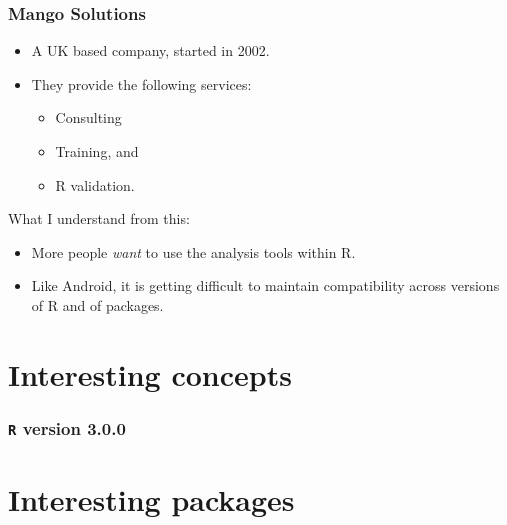 \documentclass{beamer}
\begin{document}
\begin{frame}[label=current]
  \frametitle{Mango Solutions}
  \begin{itemize}
   \item A UK based company, started in 2002.
   \item They provide the following services:
    \begin{itemize}
      \item Consulting 
      \item Training, and 
      \item R validation.
    \end{itemize}
  \end{itemize}
  \pause
  \begin{block}{What I understand from this:}
    \begin{itemize}
      \item More people \emph{want} to use the analysis tools within R.
      \item Like Android, it is getting difficult to maintain compatibility
        across versions of R and of packages.
    \end{itemize}
  \end{block}
\end{frame}

\section{Interesting concepts}
\begin{frame}
  \frametitle{\texttt{R} version 3.0.0}
\end{frame}

\section{Interesting packages}
\end{document}
